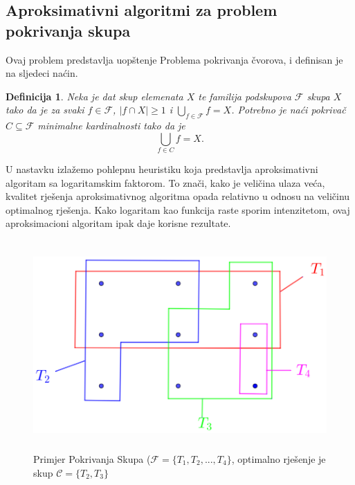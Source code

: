 \documentclass[a4paper, utf8, 11pt, colorlinks]{book}
\newtheorem{definition}{Definicija}
\begin{document}
 \subsection{Aproksimativni algoritmi za problem pokrivanja skupa}
Ovaj problem predstavlja uopštenje Problema pokrivanja čvorova, i definisan je na sljedeci naćin.
\begin{definition}
	    Neka je dat skup elemenata $X$ te familija podskupova $\mathcal{F}$ skupa $X$ tako da je za svaki $f\in \mathcal{F}$, $|f \cap X| \geq 1$ i $\bigcup_{f \in \mathcal{F}} f = X$. 
	    Potrebno je naći pokrivač $C \subseteq \mathcal{F}$ minimalne kardinalnosti tako da je 
	    $$ \bigcup_{f \in C} f = X.$$
\end{definition}
 U nastavku izlažemo pohlepnu heuristiku koja predstavlja aproksimativni algoritam sa logaritamskim faktorom. To znači, kako je veličina ulaza veća, kvalitet rješenja aproksimativnog algoritma opada relativno u odnosu na veličinu optimalnog rješenja. Kako logaritam kao funkcija raste sporim intenzitetom, ovaj aproksimacioni algoritam ipak daje korisne rezultate.

\begin{figure}
	\centering
	\includegraphics[width=120mm, height=80mm]{set-cover-1.eps}
	\caption{Primjer Pokrivanja Skupa ($\mathcal{F}=\{T_1,T_2,...,T_4\}$, optimalno rješenje je skup $\mathcal{C}=\{T_2, T_3\}$}
	 \label{fig:set-cover-1}
\end{figure}
\end{document}
